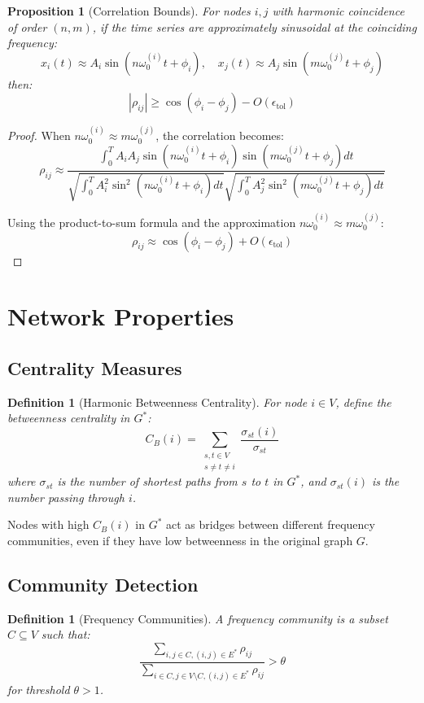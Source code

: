 \documentclass[12pt]{article}
\newtheorem{definition}[theorem]{Definition}
\newtheorem{proposition}[theorem]{Proposition}
\begin{document}
\begin{proposition}[Correlation Bounds]
For nodes $i,j$ with harmonic coincidence of order $(n,m)$, if the time series are approximately sinusoidal at the coinciding frequency:
$$
x_i(t) \approx A_i \sin(n\omega_0^{(i)} t + \phi_i), \quad x_j(t) \approx A_j \sin(m\omega_0^{(j)} t + \phi_j)
$$
then:
$$
|\rho_{ij}| \geq \cos(\phi_i - \phi_j) - O(\epsilon_{\text{tol}})
$$
\end{proposition}

\begin{proof}
When $n\omega_0^{(i)} \approx m\omega_0^{(j)}$, the correlation becomes:
$$
\rho_{ij} \approx \frac{\int_0^T A_i A_j \sin(n\omega_0^{(i)} t + \phi_i)\sin(m\omega_0^{(j)} t + \phi_j) dt}{\sqrt{\int_0^T A_i^2 \sin^2(n\omega_0^{(i)} t + \phi_i) dt} \sqrt{\int_0^T A_j^2 \sin^2(m\omega_0^{(j)} t + \phi_j) dt}}
$$

Using the product-to-sum formula and the approximation $n\omega_0^{(i)} \approx m\omega_0^{(j)}$:
$$
\rho_{ij} \approx \cos(\phi_i - \phi_j) + O(\epsilon_{\text{tol}})
$$
\end{proof}

\section{Network Properties}

\subsection{Centrality Measures}

\begin{definition}[Harmonic Betweenness Centrality]
For node $i \in V$, define the betweenness centrality in $G^*$:
$$
C_B(i) = \sum_{\substack{s,t \in V \\ s \neq t \neq i}} \frac{\sigma_{st}(i)}{\sigma_{st}}
$$
where $\sigma_{st}$ is the number of shortest paths from $s$ to $t$ in $G^*$, and $\sigma_{st}(i)$ is the number passing through $i$.
\end{definition}

Nodes with high $C_B(i)$ in $G^*$ act as bridges between different frequency communities, even if they have low betweenness in the original graph $G$.

\subsection{Community Detection}

\begin{definition}[Frequency Communities]
A frequency community is a subset $C \subseteq V$ such that:
$$
\frac{\sum_{i,j \in C, (i,j) \in E^*} \rho_{ij}}{\sum_{i \in C, j \in V \setminus C, (i,j) \in E^*} \rho_{ij}} > \theta
$$
for threshold $\theta > 1$.
\end{definition}
\end{document}
